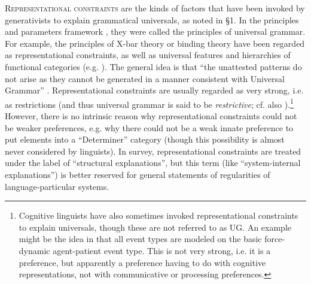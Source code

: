 \documentclass[output=paper]{langsci/langscibook}
\begin{document}
\textsc{Representational constraints} are the kinds of factors that have been invoked by generativists to explain grammatical universals, as noted in §1. In the principles and parameters framework \citep{Chomsky1981}, they were called the principles of universal grammar. For example, the principles of X-bar theory or binding theory have been regarded as representational constraints, as well as universal features and hierarchies of functional categories (e.g. \citealt{Cinque1999}). The general idea is that “the unattested patterns do not arise as they cannot be generated in a manner consistent with Universal Grammar” \citep{SmithEtAl2018}. Representational constraints are usually regarded as very strong, i.e. as restrictions (and thus universal grammar is said to be \textit{restrictive}; cf. also \citealt{Haspelmath2014_CompSyn}).\footnote{Cognitive linguists have also sometimes invoked representational constraints to explain universals, though these are not referred to as UG. An example might be the idea in \citet{Croft1991} that all event types are modeled on the basic force-dynamic agent-patient event type. This is not very strong, i.e. it is a preference, but apparently a preference having to do with cognitive representations, not with communicative or processing preferences.} However, there is no intrinsic reason why representational constraints could not be weaker preferences, e.g. why there could not be a weak innate preference to put elements into a “Determiner” category (though this possibility is almost never considered by linguists). In  survey, representational constraints are treated under the label of “structural explanations”, but this term (like “system-internal explanations”) is better reserved for general statements of regularities of language-particular systems.
\end{document}
